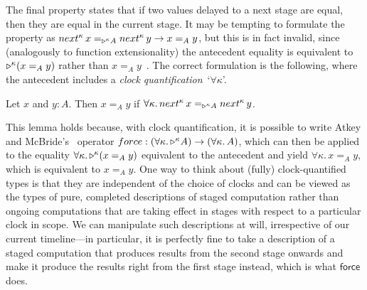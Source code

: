 \documentclass[a4paper,UKenglish,numberwithinsect,cleveref,thm-restate]{lipics-v2021}
\numberwithin{equation}{section}
\theoremstyle{definition}
\theoremstyle{plain}
\begin{document}
The final property states that if two values delayed to a next stage are equal, then they are equal in the current stage.
It may be tempting to formulate the property as $\mathsf{next}^\kappa\, x =_{\laterp^\kappa A} \mathsf{next}^\kappa\, y \to x =_A y$, but this is in fact invalid, since (analogously to function extensionality) the antecedent equality is equivalent to $\mathord{\triangleright}^\kappa (x =_A y)$ rather than $x =_A y$~\cite{Mogelberg2019a}.
The correct formulation is the following, where the antecedent includes a \emph{clock quantification}~`$\forall\kappa$'.
\begin{lemma}\label{lem:later-identity}
  Let $x$ and $y : A$. Then $x =_A y$ if\/ $\forall \kappa.\, \mathsf{next}^\kappa\,x =_{\laterp^\kappa A} \mathsf{next}^\kappa\,y$.
\end{lemma}
This lemma holds because, with clock quantification, it is possible to write Atkey and McBride's~\cite{Atkey2013b} operator $\mathsf{force} : (\forall\kappa.\, \laterp^\kappa A) \to (\forall\kappa.\, A)$, which can then be applied to the equality $\forall\kappa.\, \mathord{\triangleright}^\kappa (x =_A y)$ equivalent to the antecedent and yield $\forall\kappa.\, x =_A y$, which is equivalent to $x =_A y$.
One way to think about (fully) clock-quantified types is that they are independent of the choice of clocks and can be viewed as the types of pure, completed descriptions of staged computation rather than ongoing computations that are taking effect in stages with respect to a particular clock in scope.
We can manipulate such descriptions at will, irrespective of our current timeline---in particular, it is perfectly fine to take a description of a staged computation that produces results from the second stage onwards and make it produce the results right from the first stage instead, which is what $\mathsf{force}$ does.

\end{document}
